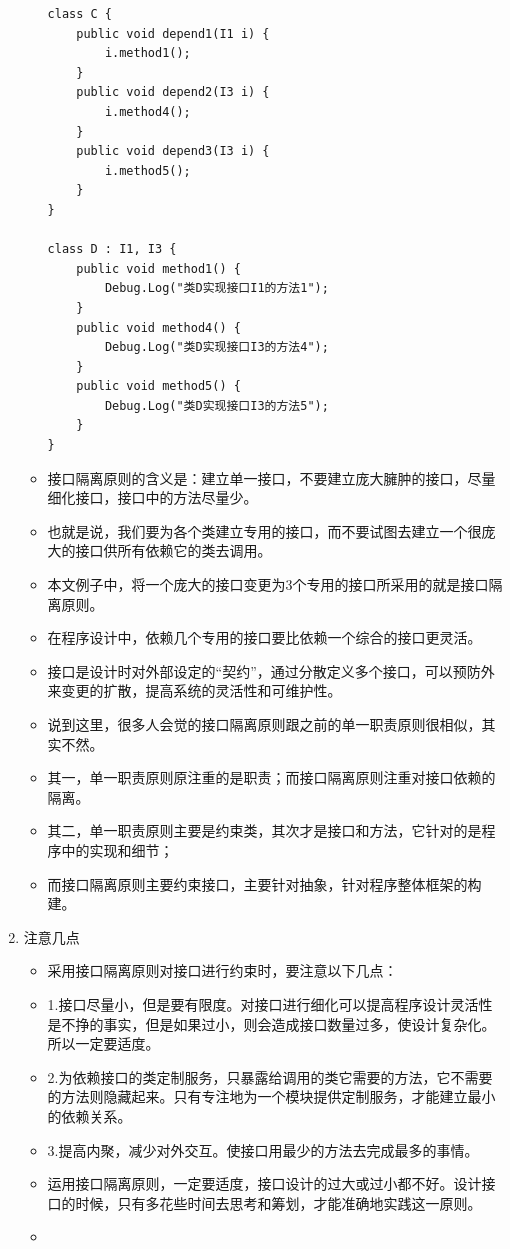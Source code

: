 \documentclass[9pt, b5paper]{article}
\begin{document}
\begin{enumerate}
\begin{itemize}
\begin{verbatim}
class C {
    public void depend1(I1 i) {
        i.method1();
    }
    public void depend2(I3 i) {
        i.method4();
    }
    public void depend3(I3 i) {
        i.method5();
    }
}

class D : I1, I3 {
    public void method1() {
        Debug.Log("类D实现接口I1的方法1");
    }
    public void method4() {
        Debug.Log("类D实现接口I3的方法4");
    }
    public void method5() {
        Debug.Log("类D实现接口I3的方法5");
    }
}
\end{verbatim}
\item 接口隔离原则的含义是：建立单一接口，不要建立庞大臃肿的接口，尽量细化接口，接口中的方法尽量少。
\item 也就是说，我们要为各个类建立专用的接口，而不要试图去建立一个很庞大的接口供所有依赖它的类去调用。
\item 本文例子中，将一个庞大的接口变更为3个专用的接口所采用的就是接口隔离原则。
\item 在程序设计中，依赖几个专用的接口要比依赖一个综合的接口更灵活。
\item 接口是设计时对外部设定的“契约”，通过分散定义多个接口，可以预防外来变更的扩散，提高系统的灵活性和可维护性。
\item 说到这里，很多人会觉的接口隔离原则跟之前的单一职责原则很相似，其实不然。
\item 其一，单一职责原则原注重的是职责；而接口隔离原则注重对接口依赖的隔离。
\item 其二，单一职责原则主要是约束类，其次才是接口和方法，它针对的是程序中的实现和细节；
\item 而接口隔离原则主要约束接口，主要针对抽象，针对程序整体框架的构建。
\end{itemize}
\item 注意几点
\label{sec:org62a1339}
\begin{itemize}
\item 采用接口隔离原则对接口进行约束时，要注意以下几点：
\item 1.接口尽量小，但是要有限度。对接口进行细化可以提高程序设计灵活性是不挣的事实，但是如果过小，则会造成接口数量过多，使设计复杂化。所以一定要适度。
\item 2.为依赖接口的类定制服务，只暴露给调用的类它需要的方法，它不需要的方法则隐藏起来。只有专注地为一个模块提供定制服务，才能建立最小的依赖关系。
\item 3.提高内聚，减少对外交互。使接口用最少的方法去完成最多的事情。
\item 运用接口隔离原则，一定要适度，接口设计的过大或过小都不好。设计接口的时候，只有多花些时间去思考和筹划，才能准确地实践这一原则。
\item 
\end{itemize}
\end{enumerate}
\end{document}
